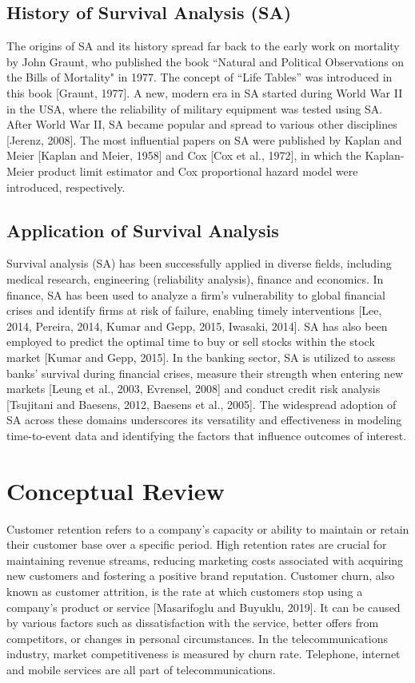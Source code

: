 \documentclass[doublespacing,12pt]{report}
\begin{document}
\subsection{History of Survival Analysis (SA)}
The origins of SA and its history spread far back to the early work on mortality by John Graunt, who published the book “Natural and Political Observations on the Bills of Mortality" in 1977. The concept of “Life Tables” was introduced in this book [Graunt, 1977]. A new, modern era in SA started during World War II in the USA, where the reliability of military equipment was tested using SA. After World War II, SA became popular and spread to various other disciplines [Jerenz, 2008]. The most influential papers on SA were published by Kaplan and Meier [Kaplan and Meier, 1958] and Cox [Cox et al., 1972], in which the Kaplan-Meier product limit estimator and Cox proportional hazard model were introduced, respectively.

\subsection{Application of Survival Analysis}
Survival analysis (SA) has been successfully applied in diverse fields, including medical research, engineering (reliability analysis), finance and economics. In finance, SA has been used to analyze a firm's vulnerability to global financial crises and identify firms at risk of failure, enabling timely interventions [Lee, 2014, Pereira, 2014, Kumar and Gepp, 2015, Iwasaki, 2014]. SA has also been employed to predict the optimal time to buy or sell stocks within the stock market [Kumar and Gepp, 2015]. In the banking sector, SA is utilized to assess banks' survival during financial crises, measure their strength when entering new markets [Leung et al., 2003, Evrensel, 2008] and conduct credit risk analysis [Tsujitani and Baesens, 2012, Baesens et al., 2005]. The widespread adoption of SA across these domains underscores its versatility and effectiveness in modeling time-to-event data and identifying the factors that influence outcomes of interest.

\section{Conceptual Review}

Customer retention refers to a company's capacity or ability to maintain or retain their customer base over a specific period. High retention rates are crucial for maintaining revenue streams, reducing marketing costs associated with acquiring new customers and fostering a positive brand reputation. Customer churn, also known as customer attrition, is the rate at which customers stop using a company's product or service [Masarifoglu and Buyuklu, 2019]. It can be caused by various factors such as dissatisfaction with the service, better offers from competitors, or changes in personal circumstances. In the telecommunications industry, market competitiveness is measured by churn rate. Telephone, internet and mobile services are all part of telecommunications.
\end{document}
